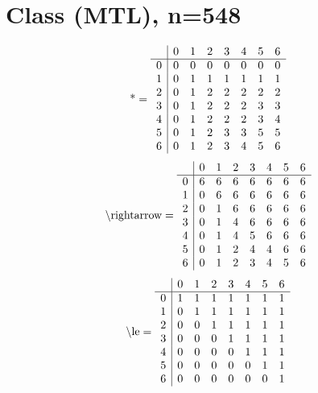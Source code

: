 \documentclass[11pt]{article}
\begin{document}
\section{Class (MTL), n=548}
\[\text{*} = 
\begin{array}{r | r r r r r r r}
 & 0 & 1 & 2 & 3 & 4 & 5 & 6 \\ \hline
0 & 0 & 0 & 0 & 0 & 0 & 0 & 0 \\
1 & 0 & 1 & 1 & 1 & 1 & 1 & 1 \\
2 & 0 & 1 & 2 & 2 & 2 & 2 & 2 \\
3 & 0 & 1 & 2 & 2 & 2 & 3 & 3 \\
4 & 0 & 1 & 2 & 2 & 2 & 3 & 4 \\
5 & 0 & 1 & 2 & 3 & 3 & 5 & 5 \\
6 & 0 & 1 & 2 & 3 & 4 & 5 & 6 \\
\end{array}
\]
\[\text{\textbackslash rightarrow} = 
\begin{array}{r | r r r r r r r}
 & 0 & 1 & 2 & 3 & 4 & 5 & 6 \\ \hline
0 & 6 & 6 & 6 & 6 & 6 & 6 & 6 \\
1 & 0 & 6 & 6 & 6 & 6 & 6 & 6 \\
2 & 0 & 1 & 6 & 6 & 6 & 6 & 6 \\
3 & 0 & 1 & 4 & 6 & 6 & 6 & 6 \\
4 & 0 & 1 & 4 & 5 & 6 & 6 & 6 \\
5 & 0 & 1 & 2 & 4 & 4 & 6 & 6 \\
6 & 0 & 1 & 2 & 3 & 4 & 5 & 6 \\
\end{array}
\]
\[\text{\textbackslash le} = 
\begin{array}{r | r r r r r r r}
 & 0 & 1 & 2 & 3 & 4 & 5 & 6 \\ \hline
0 & 1 & 1 & 1 & 1 & 1 & 1 & 1 \\
1 & 0 & 1 & 1 & 1 & 1 & 1 & 1 \\
2 & 0 & 0 & 1 & 1 & 1 & 1 & 1 \\
3 & 0 & 0 & 0 & 1 & 1 & 1 & 1 \\
4 & 0 & 0 & 0 & 0 & 1 & 1 & 1 \\
5 & 0 & 0 & 0 & 0 & 0 & 1 & 1 \\
6 & 0 & 0 & 0 & 0 & 0 & 0 & 1 \\
\end{array}
\]
\end{document}
